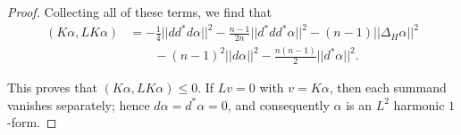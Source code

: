 \documentclass[10pt,a4paper]{amsart}
\begin{document}
\begin{proof}
Collecting all of these terms, we find that
\begin{align*}
(K\alpha, LK\alpha) & = -\frac14 ||dd^*d\alpha||^2 - \frac{n-1}{2n} ||d^* d d^*\alpha||^2 - (n-1) ||\Delta_H \alpha||^2 \\ 
& \qquad - (n-1)^2 ||d\alpha||^2 - \frac{n(n-1)}{2} ||d^*\alpha||^2. 
\end{align*}

This proves that $(K \alpha, L K \alpha) \leq 0$.   If $L v = 0$ with $v = K \alpha$, then each summand vanishes separately; hence 
$d\alpha = d^* \alpha = 0$, and consequently $\alpha$ is an $L^2$ harmonic $1$-form.  
\end{proof}
\end{document}
